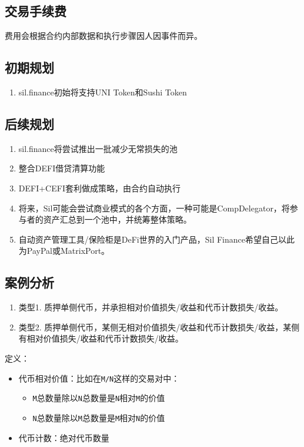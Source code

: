 \documentclass[11pt,letterpaper]{article}
\begin{document}
\begin{multicols}{2}
\subsection{交易手续费}
费用会根据合约内部数据和执行步骤因人因事件而异。

\subsection{初期规划}
\begin{enumerate}
  \item sil.finance初始将支持UNI Token和Sushi Token
\end{enumerate}

\subsection{后续规划}
\begin{enumerate}
  \item sil.finance将尝试推出一批减少无常损失的池
  \item 整合DEFI借贷清算功能
  \item DEFI+CEFI套利做成策略，由合约自动执行
  \item 将来，Sil可能会尝试商业模式的各个方面，一种可能是CompDelegator，将参与者的资产汇总到一个池中，并统筹整体策略。
  \item 自动资产管理工具/保险柜是DeFi世界的入门产品，Sil Finance希望自己以此为PayPal或MatrixPort。
\end{enumerate}

\subsection{案例分析}
\begin{enumerate}
  \item 类型1. 质押单侧代币，并承担相对价值损失/收益和代币计数损失/收益。
  \item 类型2. 质押单侧代币，某侧无相对价值损失/收益和代币计数损失/收益，某侧有相对价值损失/收益和代币计数损失/收益。
\end{enumerate}
定义：
\begin{itemize}
  \item 代币相对价值：比如在\texttt{M/N}这样的交易对中：
  \begin{itemize}
    \item \texttt{M}总数量除以\texttt{N}总数量是\texttt{N}相对\texttt{M}的价值
    \item \texttt{N}总数量除以\texttt{M}总数量是\texttt{M}相对\texttt{N}的价值
  \end{itemize}
  \item 代币计数：绝对代币数量
\end{itemize}


\end{multicols}
\end{document}

